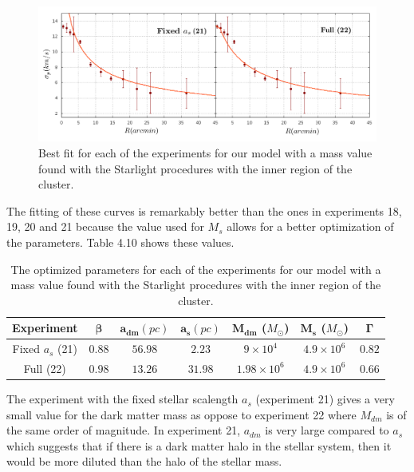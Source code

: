 \begin{figure}[H]
\centering
\includegraphics[width=15cm]{images/Starlight_25_12.png}
\caption[Best fits for our model with a mass value based on the Starlight procedures with the inner region.]{Best fit for each of the experiments for our model with a mass value found with the Starlight procedures with the inner region of the cluster.}
\end{figure}

The fitting of these curves is remarkably better than the ones in experiments 18, 19, 20 and 21 because the value used for $M_s$ allows for a better optimization of the parameters. Table 4.10 shows these values.

\begin{table}[]
\centering
\begin{tabular}{| c| c| c| c| c| c| c|}
    \hline
    \textbf{Experiment} & $\mathbf{\beta}$ & $\mathbf{a_{dm}} (pc)$ & $\mathbf{a_{s}} (pc)$ & $\mathbf{M_{dm}}$ ($M_{\odot}$) & $\mathbf{M_{s}}$ ($M_{\odot}$) & $\mathbf{\Gamma}$\\ \hline
	Fixed $a_s$ (21) &	$0.88$ &	$56.98$ &	$2.23$ &	$9 \times 10^{4}$ &	$4.9 \times 10 ^{6}$ &	$0.82$\\ \hline
	Full (22) &	$0.98$ &	$13.26$ &	$31.98$ &	$1.98 \times 10^{6}$ &	$4.9 \times 10^{6}$ &	$0.66$\\ \hline
  \end{tabular} 
\caption[Optimized parameters for our model with a mass value based on the Starlight procedures with the inner region.]{The optimized parameters for each of the experiments for our model with a mass value found with the Starlight procedures with the inner region of the cluster.}
\end{table}

The experiment with the fixed stellar scalength $a_s$ (experiment 21) gives a very small value for the dark matter mass as oppose to experiment 22 where $M_{dm}$ is of the same order of magnitude. In experiment 21, $a_{dm}$ is very large compared to $a_s$ which suggests that if there is a dark matter halo in the stellar system, then it would be more diluted than the halo of the stellar mass.

